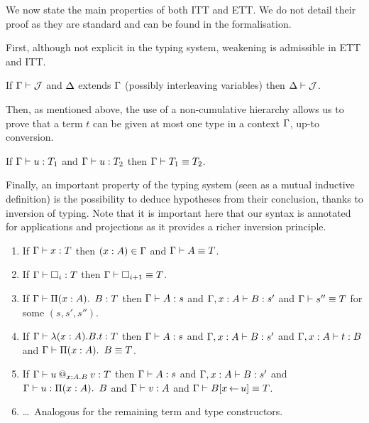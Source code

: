 We now state the main properties of both ITT and ETT.
%
We do not detail their proof as they are standard and can be found
in the \Coq formalisation.

First, although not explicit in the typing system, weakening is
admissible in ETT and ITT.

\begin{lemma}[Weakening]
  \label{lem:weak}
  If $\Gamma \vdash \mathcal{J}$ and $\Delta$ extends $\Gamma$ (possibly interleaving variables)
  then $\Delta \vdash \mathcal{J}$.
\end{lemma}

Then, as mentioned above, the use of a non-cumulative hierarchy allows
us to prove that a term $t$ can be given at most one type in a
context $\Gamma$, up-to conversion.

\begin{lemma}
  \label{lem:uniq}
  If $\Gamma \vdash u : T_1$ and $\Gamma \vdash u : T_2$
  then $\Gamma \vdash T_1 \equiv T_2$.
\end{lemma}

Finally, an important property of the typing system (seen as a mutual
inductive definition) is the possibility to deduce hypotheses from
their conclusion, thanks to inversion of typing. Note that it is
important here that our syntax is annotated for applications and
projections as it provides a richer inversion principle.

\begin{lemma}
  \label{lem:inversion}
  \leavevmode
  \begin{enumerate}
    \item If $\Gamma \vdash x : T$ then $(x : A) \in \Gamma$ and
    $\Gamma \vdash A \equiv T$.
    \item If $\Gamma \vdash \square_{i} : T$ then $\Gamma \vdash \square_{i+1} \equiv T$.
    \item If $\Gamma \vdash \mathop{\Pi(x:A).\ }{B} : T$ then $\Gamma \vdash A : s$ and
    $\Gamma, x:A \vdash B : s'$ and $\Gamma \vdash s'' \equiv T$ for some $(s,s',s'')$.
    \item If $\Gamma \vdash \lambda (x:A). B . t : T$ then $\Gamma \vdash A : s$ and
    $\Gamma, x:A \vdash B : s'$ and $\Gamma, x:A \vdash t : B$ and
    $\Gamma \vdash \mathop{\Pi(x:A).\ }{B} \equiv T$.
    \item If $\Gamma \vdash u\mathbin{@_{x:A.B}} v : T$ then $\Gamma \vdash A : s$ and
    $\Gamma, x:A \vdash B : s'$ and $\Gamma \vdash u : \mathop{\Pi(x:A).\ }{B}$ and
    $\Gamma \vdash v : A$ and $\Gamma \vdash B[ x \mathop{\leftarrow} u] \equiv T$.
    \item \ldots\ Analogous for the remaining term and type constructors.
  \end{enumerate}
\end{lemma}

